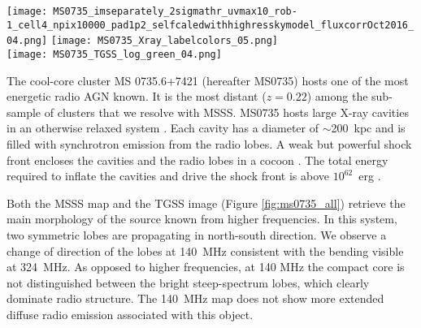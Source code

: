\documentclass{aa}  %
\begin{document}
 
\begin{figure*}[t]
\begin{center}
\texttt{[image: MS0735\_imseparately\_2sigmathr\_uvmax10\_rob-1\_cell4\_npix10000\_pad1p2\_selfcaledwithhighresskymodel\_fluxcorrOct2016\_04.png]}
\texttt{[image: MS0735\_Xray\_labelcolors\_05.png]} \\
\texttt{[image: MS0735\_TGSS\_log\_green\_04.png]} 
\end{center}
\caption{\small MS0735+7421. Top left: Reprocessed MSSS map with resolution $27.8^{\prime\prime}\times27.8^{\prime\prime}$ and rms noise 30~mJy/beam. The contours start at 5$\sigma$ level and are drawn at 0.150~mJy/beam $\times$ [1, 1.4, 2, 2.8, 4, 5.7]. Top right: \textit{Chandra} X-ray surface brightness residual map. The image is produced by unsharp masking using archival data in the 0.5 -- 7 keV band with total exposure of 520~ksec after standard filtering. Green contours correspond to the MSSS image. Bottom: TGSS map with resolution $25.0^{\prime\prime}\times25.0^{\prime\prime}$ and rms noise 3~mJy/beam. The contours start at 5$\sigma$ level and are drawn at 15~mJy/beam $\times$ [1, 1.4, 2, 2.8, 4, 5.7, 8, 11, 16, 22, 32]. 
\label{fig:ms0735_all}}
\vspace{0.15in}
\end{figure*}   
 


The cool-core cluster MS 0735.6+7421 (hereafter MS0735) hosts one of the most energetic radio AGN known. 
It is the most distant ($z = 0.22$) among the sub-sample of clusters that we resolve with MSSS. 
MS0735 hosts large X-ray cavities in an otherwise relaxed system \citep{Gitti2007}. 
Each cavity has a diameter of $\sim$200~kpc and is filled with synchrotron emission from the radio lobes. 
A weak but powerful shock front encloses the cavities and the radio lobes in a cocoon \citep{McNamara2005}. 
The total energy required to inflate the cavities and drive the shock front is above $10^{62}$~erg \citep{McNamara2009, Vantyghem2014}.

Both the MSSS map and the TGSS image (Figure \ref{fig:ms0735_all}) retrieve the main morphology of the source known from higher frequencies.
In this system, two symmetric lobes are propagating in north-south direction.
We observe a change of direction of the lobes at 140~MHz consistent with the bending visible at 324~MHz.
As opposed to higher frequencies, at 140 MHz the compact core is not distinguished between the bright steep-spectrum lobes, which clearly dominate radio structure.
The 140~MHz map does not show more extended diffuse radio emission associated with this object.
\end{document}
